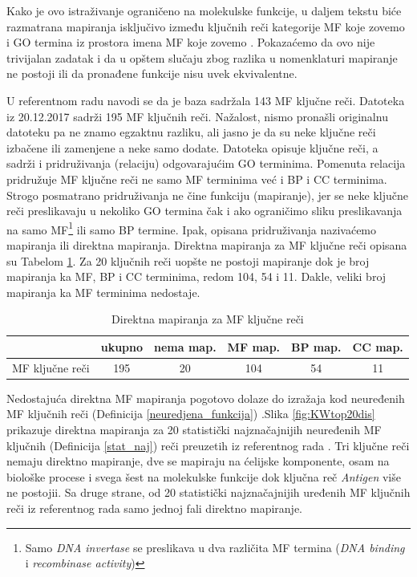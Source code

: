 Kako je ovo istraživanje ograničeno na molekulske funkcije, u daljem tekstu
biće razmatrana mapiranja isključivo između ključnih reči kategorije MF koje
zovemo  i GO termina iz prostora imena MF koje zovemo
. Pokazaćemo da ovo nije trivijalan zadatak i da u opštem
slučaju zbog razlika u nomenklaturi mapiranje ne postoji ili da pronađene
funkcije nisu uvek ekvivalentne.

U referentnom radu navodi se da je \swissprot baza sadržala 143 MF ključne
reči.  Datoteka  \cite{keywlist_txt} iz 20.12.2017 sadrži
195 MF ključnih reči.  Nažalost, nismo pronašli originalnu 
datoteku pa  ne znamo egzaktnu razliku, ali jasno je da su neke ključne reči
izbačene ili zamenjene a neke samo dodate. Datoteka  opisuje
ključne reči, a sadrži i pridruživanja (relaciju) odgovarajućim GO terminima.
Pomenuta relacija pridružuje MF ključne reči ne samo MF terminima već i BP i CC
terminima. Strogo posmatrano pridruživanja ne čine funkciju (mapiranje), jer se
neke ključne reči preslikavaju u nekoliko GO termina čak i ako ograničimo sliku
preslikavanja na samo MF\footnote{Samo \textit{DNA invertase} se preslikava u
dva različita MF termina (\textit{DNA binding} i \textit{recombinase
activity})} ili samo BP termine.  Ipak, opisana
pridruživanja nazivaćemo mapiranja ili direktna mapiranja. Direktna mapiranja
za MF ključne reči opisana su Tabelom \ref{tab:direktna_map}.  Za 20 ključnih reči
uopšte ne postoji mapiranje dok je broj mapiranja ka MF, BP i CC terminima,
redom 104, 54 i 11. Dakle, veliki broj mapiranja ka MF terminima nedostaje.

\begin{table}[htpb]
\begin{tabular}{|r|c|c|c|c|c|}
  \hline
                   & ukupno & nema map. &  MF map. & BP map. & CC map.      \\
  \hline
   MF ključne reči & 195    &  20       &  104     & 54      & 11           \\
  \hline
\end{tabular}
  \centering
  \caption{Direktna mapiranja za MF ključne reči}
  \label{tab:direktna_map}
\end{table}

Nedostajuća direktna MF mapiranja pogotovo dolaze do izražaja kod neuređenih MF
ključnih reči (Definicija \ref{neuredjena_funkcija}) .Slika
\ref{fig:KWtop20dis} prikazuje direktna mapiranja za 20 statistički
najznačajnijih neuređenih MF ključnih (Definicija \ref{stat_naj}) reči preuzetih iz referentnog rada
\parencite{Xie2007}.  Tri ključne reči nemaju direktno mapiranje, dve se
mapiraju na ćelijske komponente, osam na biološke procese i svega šest na
molekulske funkcije dok ključna reč \textit{Antigen} više ne postojii. Sa druge
strane, od 20 statistički najznačajnijih uređenih MF ključnih reči iz
referentnog rada samo jednoj fali direktno mapiranje.


